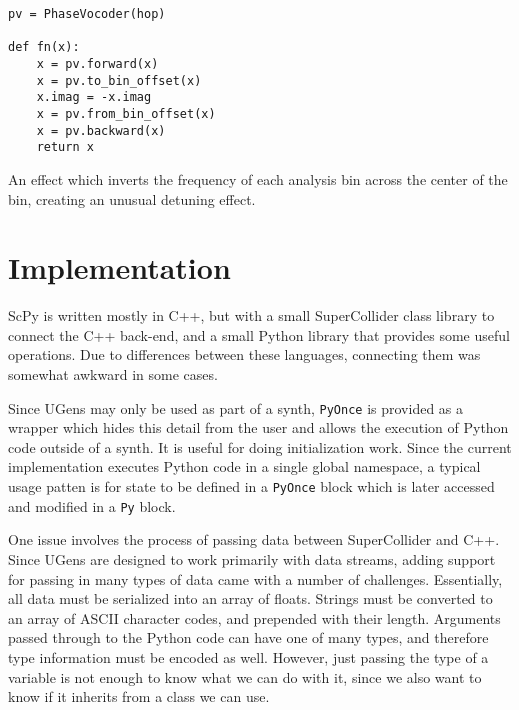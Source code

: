 \documentclass{article}
\begin{document}
\begin{listing}[ht]
    \begin{verbatim}
pv = PhaseVocoder(hop)

def fn(x):
    x = pv.forward(x)
    x = pv.to_bin_offset(x)
    x.imag = -x.imag
    x = pv.from_bin_offset(x)
    x = pv.backward(x)
    return x
    \end{verbatim}
    \caption{An effect which inverts the frequency of each analysis bin across the center of
    the bin, creating an unusual detuning effect.}
    \label{lst:binflipper}
\end{listing}

\section{Implementation}\label{sec:implementation}

ScPy is written mostly in C++, but with a small SuperCollider class library to connect the C++
back-end, and a small Python library that provides some useful operations. Due to differences
between these languages, connecting them was somewhat awkward in some cases.

Since UGens may only be used as part of a synth, \texttt{PyOnce} is provided as a wrapper which
hides this detail from the user and allows the execution of Python code outside of a synth. It is
useful for doing initialization work. Since the current implementation executes Python code in a
single global namespace, a typical usage patten is for state to be defined in a \texttt{PyOnce}
block which is later accessed and modified in a \texttt{Py} block.

One issue involves the process of passing data between SuperCollider and C++. Since UGens are
designed to work primarily with data streams, adding support for passing in many types of data came
with a number of challenges. Essentially, all data must be serialized into an array of floats.
Strings must be converted to an array of ASCII character codes, and prepended with their length.
Arguments passed through to the Python code can have one of many types, and therefore type
information must be encoded as well. However, just passing the type of a variable is not enough to
know what we can do with it, since we also want to know if it inherits from a class we can use.
\end{document}
